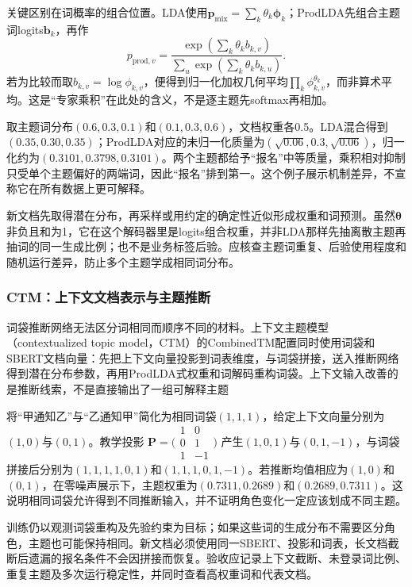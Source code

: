 关键区别在词概率的组合位置。LDA使用$\bm p_{\mathrm{mix}}=\sum_k\theta_k\bm\phi_k$；ProdLDA先组合主题词logits$\bm b_k$，再作
\[
 p_{\mathrm{prod},v}
 =\frac{\exp(\sum_k\theta_k b_{k,v})}
 {\sum_u\exp(\sum_k\theta_k b_{k,u})}.
\]
若为比较而取$b_{k,v}=\log\phi_{k,v}$，便得到归一化加权几何平均$\prod_k\phi_{k,v}^{\theta_k}$，而非算术平均。这是“专家乘积”在此处的含义，不是逐主题先softmax再相加。

取主题词分布$(0.6,0.3,0.1)$和$(0.1,0.3,0.6)$，文档权重各0.5。LDA混合得到$(0.35,0.30,0.35)$；ProdLDA对应的未归一化质量为$(\sqrt{0.06},0.3,\sqrt{0.06})$，归一化约为$(0.3101,0.3798,0.3101)$。两个主题都给予“报名”中等质量，乘积相对抑制只受单个主题偏好的两端词，因此“报名”排到第一。这个例子展示机制差异，不宣称它在所有数据上更可解释。

新文档先取得潜在分布，再采样或用约定的确定性近似形成权重和词预测。虽然$\bm\theta$非负且和为1，它在这个解码器里是logits组合权重，并非LDA那样先抽离散主题再抽词的同一生成比例；也不是业务标签后验。应核查主题词重复、后验使用程度和随机运行差异，防止多个主题学成相同词分布。

\subsubsection{CTM：上下文文档表示与主题推断}
\label{sec:nlp-classification-ctm}

词袋推断网络无法区分词相同而顺序不同的材料。上下文主题模型（contextualized topic model，CTM）的CombinedTM配置同时使用词袋和SBERT文档向量：先把上下文向量投影到词表维度，与词袋拼接，送入推断网络得到潜在分布参数，再用ProdLDA式权重和词解码重构词袋。上下文输入改善的是推断线索，不是直接输出了一组可解释主题

将“甲通知乙”与“乙通知甲”简化为相同词袋$(1,1,1)$，给定上下文向量分别为$(1,0)$与$(0,1)$。教学投影
$\bm P=\bigl(\begin{smallmatrix}1&0\\0&1\\1&-1\end{smallmatrix}\bigr)$
产生$(1,0,1)$与$(0,1,-1)$，与词袋拼接后分别为$(1,1,1,1,0,1)$和$(1,1,1,0,1,-1)$。若推断均值相应为$(1,0)$和$(0,1)$，在零噪声展示下，主题权重为$(0.7311,0.2689)$和$(0.2689,0.7311)$。这说明相同词袋允许得到不同推断输入，并不证明角色变化一定应该划成不同主题。

训练仍以观测词袋重构及先验约束为目标；如果这些词的生成分布不需要区分角色，主题也可能保持相同。新文档必须使用同一SBERT、投影和词表，长文档截断后遗漏的报名条件不会因拼接而恢复。验收应记录上下文截断、未登录词比例、重复主题及多次运行稳定性，并同时查看高权重词和代表文档。

